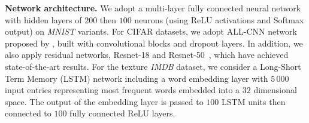 \documentclass[11pt]{article}
\theoremstyle{k}
\begin{document}
\textbf{Network architecture.} We adopt a multi-layer fully connected neural network with hidden layers of $200$ then $100$ neurons (using \textrm{ReLU} activations and \textrm{Softmax} output) on \textit{MNIST} variants. 
For CIFAR datasets, we adopt ALL-CNN network proposed by \citep{CNN15}, built with convolutional blocks and dropout layers.
 In addition, we also apply residual networks, Resnet-18 and Resnet-50~\citep{Rnet16}, which have achieved state-of-the-art results.
For the texture \textit{IMDB} dataset, we consider a Long-Short Term Memory (LSTM) network \citep{gers1999learning} including a word embedding layer with $5\,000$ input entries representing most frequent words embedded into a $32$ dimensional space. 
The output of the embedding layer is passed to $100$ LSTM units then connected to $100$ fully connected \textrm{ReLU} layers. 
\end{document}
